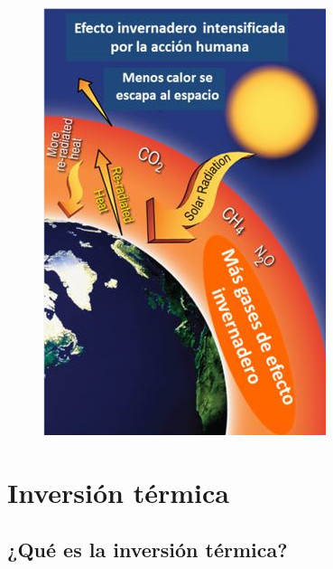\documentclass[12pt]{article}
\begin{document}
\begin{figure}[H]
    \centering
    \includegraphics[scale=0.6]{Imagenes/Efecto_Invernadero_03.jpg}
\end{figure}

\section{Inversión térmica}
\subsection{¿Qué es la inversión térmica?}
\end{document}
